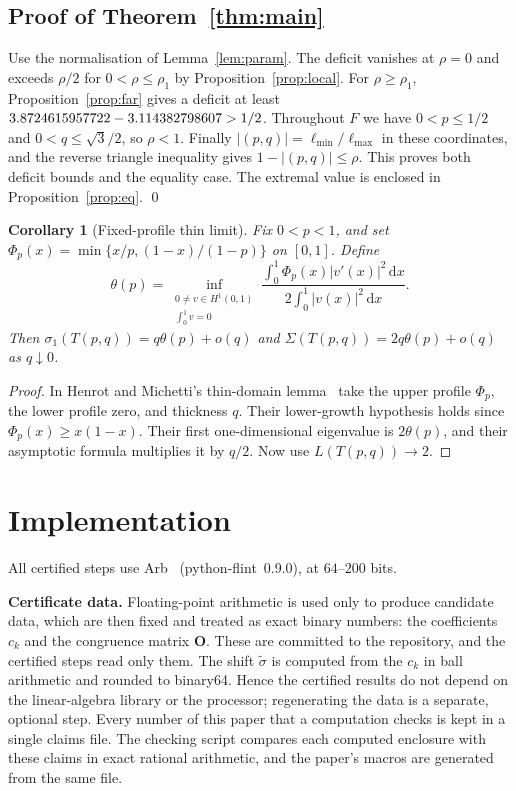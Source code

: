 \documentclass[11pt]{article}
\newtheorem{corollary}[theorem]{Corollary}
\theoremstyle{definition}
\theoremstyle{remark}
\newcommand{\dd}{\,\mathrm{d}}
\begin{document}
\subsection*{Proof of Theorem~\ref{thm:main}}
Use the normalisation of Lemma~\ref{lem:param}. The deficit vanishes at $\rho=0$ and exceeds
$\rho/2$ for $0<\rho\le\rho_1$ by Proposition~\ref{prop:local}. For $\rho\ge\rho_1$,
Proposition~\ref{prop:far} gives a deficit at least $3.8724615957722-3.114382798607>1/2$.
Throughout $F$ we have $0<p\le1/2$ and $0<q\le\sqrt3/2$, so $\rho<1$.
Finally $|(p,q)|=\ell_{\min}/\ell_{\max}$ in these coordinates, and the reverse triangle
inequality gives $1-|(p,q)|\le\rho$. This proves both deficit bounds and the equality case.
The extremal value is enclosed in Proposition~\ref{prop:eq}.
\qed

\begin{corollary}[Fixed-profile thin limit]\label{cor:thin}
Fix $0<p<1$, and set $\Phi_p(x)=\min\{x/p,(1-x)/(1-p)\}$ on $[0,1]$. Define
\[
 \theta(p)=\inf_{\substack{0\ne v\in H^1(0,1)\\ \int_0^1v=0}}
 \frac{\int_0^1\Phi_p(x)|v'(x)|^2\dd x}{2\int_0^1|v(x)|^2\dd x}.
\]
Then $\sigma_1(T(p,q))=q\theta(p)+o(q)$ and $\Sigma(T(p,q))=2q\theta(p)+o(q)$ as $q\downarrow0$.
\end{corollary}
\begin{proof}
In Henrot and Michetti's thin-domain lemma~\cite[Lemma~3.2]{HM} take the upper profile $\Phi_p$,
the lower profile zero, and thickness $q$. Their lower-growth hypothesis holds since
$\Phi_p(x)\ge x(1-x)$. Their first one-dimensional eigenvalue is $2\theta(p)$, and their
asymptotic formula multiplies it by $q/2$. Now use $L(T(p,q))\to2$.
\end{proof}

\section{Implementation}\label{sec:cert}

All certified steps use Arb~\cite{Arb} (python-flint~0.9.0), at $64$--$200$ bits.

\textbf{Certificate data.} Floating-point arithmetic is used only to produce candidate data, which are then
fixed and treated as exact binary numbers: the coefficients $c_k$ and the congruence matrix $\mathbf O$. These
are committed to the repository, and the certified steps read only them. The shift $\tilde\sigma$ is computed
from the $c_k$ in ball arithmetic and rounded to binary64. Hence the certified results do not depend on the
linear-algebra library or the processor; regenerating the data is a separate, optional step. Every number of
this paper that a computation checks is kept in a single claims file. The checking script compares each
computed enclosure with these claims in exact rational arithmetic, and the paper's macros are generated from
the same file.
\end{document}

